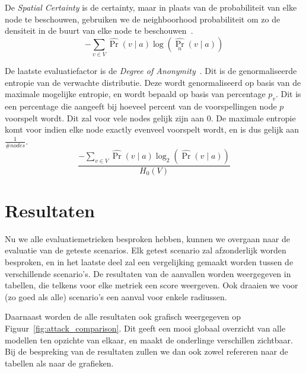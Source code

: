 De \textit{Spatial Certainty} is de certainty, maar in plaats van de
probabiliteit van elke node te beschouwen, gebruiken we de neighboorhood
probabiliteit om zo de densiteit in de buurt van elke node te
beschouwen~\cite{Dhondt}.
\begin{equation}
    -\sum_{v \in V} \widehat{\operatorname{Pr}}(v \mid a) \log \left(\widehat{\operatorname{Pr}_n}(v \mid a)\right)\label{eq:spatial_certainty}
\end{equation}

De laatste evaluatiefactor is de \textit{Degree of
    Anonymity}~\cite{Dhondt,Verdonck_2022}. Dit is de genormaliseerde entropie van
de verwachte distributie. Deze wordt genormaliseerd op basis van de maximale
mogelijke entropie, en wordt bepaald op basis van percentage $p_v$. Dit is een
percentage die aangeeft bij hoeveel percent van de voorspellingen node $p$
voorspelt wordt. Dit zal voor vele nodes gelijk zijn aan 0. De maximale
entropie komt voor indien elke node exactly evenveel voorspelt wordt, en is dus
gelijk aan $\frac{1}{\# nodes}$.
\begin{equation}
    \frac{-\sum_{v \in V} \widehat{\operatorname{Pr}}(v \mid a) \log _2(\widehat{\operatorname{Pr}}(v \mid a))}{H_0(V)}\label{eq:degree_of_anonymity}
\end{equation}

\section{Resultaten}
Nu we alle evaluatiemetrieken besproken hebben, kunnen we overgaan naar de
evaluatie van de geteste scenarios. Elk getest scenario zal afzonderlijk worden
besproken, en in het laatste deel zal een vergelijking gemaakt worden tussen de
verschillende scenario's. De resultaten van de aanvallen worden weergegeven in
tabellen, die telkens voor elke metriek een score weergeven. Ook draaien we
voor (zo goed als alle) scenario's een aanval voor enkele radiussen.

Daarnaast worden de alle resultaten ook grafisch weergegeven op
Figuur~\ref{fig:attack_comparison}. Dit geeft een mooi globaal overzicht van
alle modellen ten opzichte van elkaar, en maakt de onderlinge verschillen
zichtbaar. Bij de bespreking van de resultaten zullen we dan ook zowel
refereren naar de tabellen als naar de grafieken.

